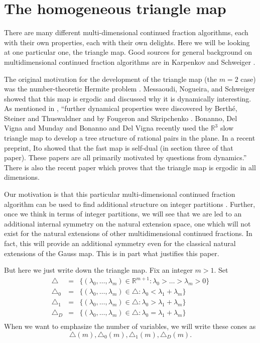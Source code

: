 \documentclass[12pt,oneside,openany]{article}
\def\R{{\mathbb R}} %
\begin{document}
\section{The homogeneous triangle map}\label{The homogeneous triangle map}
There are many different multi-dimensional continued fraction algorithms, each with their own properties, each with their own delights.  Here we will be looking at one particular one, the triangle map.  Good sources for general   background on multidimensional continued fraction algorithms are in  Karpenkov \cite{Karpenkov 1} and Schweiger \cite{Sch} .  

The original motivation for the development of the triangle map (the $m=2$ case) was the number-theoretic  Hermite problem \cite{Garrity1, Ass}.   Messaoudi,  Nogueira, and  Schweiger \cite{Mes} 
showed that  this map  is ergodic and discussed why it is dynamically interesting.  
As mentioned in \cite{BBDGI}, ``further dynamical properties were discovered by  Berth\'e, Steiner and Thuswaldner \cite{Berthe-Steiner-Thuswaldner}  and by Fougeron and  Skripchenko \cite{Fougeron-Skripchenko}.   Bonanno, Del Vigna and  Munday \cite {Bonanno- Del Vigna-Munday} and Bonanno and Del Vigna \cite{Bonanno-Del Vigna} recently used the $\R^3$ slow  triangle map to develop a tree structure of rational pairs in the plane.   In a recent preprint, Ito \cite{Ito} showed that the fast  map is self-dual (in section three of that paper).  These papers are all primarily motivated by questions from dynamics.'' There is also the recent paper \cite{Garrity-Lehmann Duke} which proves that the triangle map is ergodic in all dimensions.  





Our motivation is that this particular multi-dimensional continued fraction algorithm can be used to find additional structure on integer partitions \cite{BBDGI, BG}.  Further, once we think in terms of integer partitions, we will see that we are led to an additional internal symmetry on the natural extension space, one which will not exist for the natural extensions of other multidimensional continued fractions.  In fact, this will provide an additional symmetry even for the classical natural extensions of the Gauss map.  This is in part what justifies this paper. 


But here we just write down the triangle map.  Fix an integer $m>1$.  Set
\begin{eqnarray*}
\triangle &=& \{    (\lambda_0, \ldots, \lambda_m)\in \R^{m+1}: \lambda_0 > \ldots > \lambda_m >0 \} \\
\triangle_0 &=& \{(\lambda_0, \ldots, \lambda_m)\in \triangle: \lambda_0 < \lambda_1+\lambda_m \} \\
\triangle_1 &=& \{(\lambda_0, \ldots, \lambda_m)\in \triangle: \lambda_0 >\lambda_1+\lambda_m \} \\
\triangle_D &=& \{(\lambda_0, \ldots, \lambda_m)\in \triangle: \lambda_0 =\lambda_1+\lambda_m \} \\
\end{eqnarray*}
When we want to emphasize the number of variables, we will write these cones as $$  \triangle(m) ,  \triangle_0 (m), \triangle_1 (m), \triangle_D (m) .$$
\end{document}

